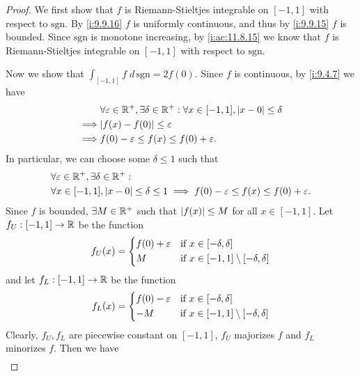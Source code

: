 \begin{proof}
  We first show that \(f\) is Riemann-Stieltjes integrable on \([-1, 1]\) with respect to \(\text{sgn}\).
  By \cref{i:9.9.16} \(f\) is uniformly continuous, and thus by \cref{i:9.9.15} \(f\) is bounded.
  Since \(\text{sgn}\) is monotone increasing, by \cref{i:ac:11.8.15} we know that \(f\) is Riemann-Stieltjes integrable on \([-1, 1]\) with respect to \(\text{sgn}\).

  Now we show that \(\int_{[-1, 1]} f \; d \, \text{sgn} = 2f(0)\).
  Since \(f\) is continuous, by \cref{i:9.4.7} we have
  \begin{align*}
             & \forall \varepsilon \in \R^+, \exists \delta \in \R^+ : \forall x \in [-1, 1], \abs{x - 0} \leq \delta \\
    \implies & \abs{f(x) - f(0)} \leq \varepsilon                                                                     \\
    \implies & f(0) - \varepsilon \leq f(x) \leq f(0) + \varepsilon.
  \end{align*}
  In particular, we can choose some \(\delta \leq 1\) such that
  \begin{align*}
     & \forall \varepsilon \in \mathbb{R}^+, \exists \delta \in \mathbb{R}^+ :                                                              \\
     & \forall x \in [-1, 1], \left\lvert x - 0\right\rvert \leq \delta \leq 1 \implies f(0) - \varepsilon \leq f(x) \leq f(0) + \varepsilon.
  \end{align*}
  Since \(f\) is bounded, \(\exists M \in \mathbb{R}^+\) such that \(\left\lvert f(x)\right\rvert \leq M\) for all \(x \in [-1, 1]\).
  Let \(f_U : [-1, 1] \to \mathbb{R}\) be the function
  \[
    f_U(x) = \begin{dcases}
      f(0) + \varepsilon & \text{if } x \in [-\delta, \delta]                   \\
      M                  & \text{if } x \in [-1, 1] \setminus [-\delta, \delta]
    \end{dcases}
  \]
  and let \(f_L : [-1, 1] \to \mathbb{R}\) be the function
  \[
    f_L(x) = \begin{dcases}
      f(0) - \varepsilon & \text{if } x \in [-\delta, \delta]                   \\
      -M                 & \text{if } x \in [-1, 1] \setminus [-\delta, \delta]
    \end{dcases}
  \]
  Clearly, \(f_U, f_L\) are piecewise constant on \([-1, 1]\), \(f_U\) majorizes \(f\) and \(f_L\) minorizes \(f\).
  Then we have
  \begin{align*}

\end{align*}
\end{proof}
